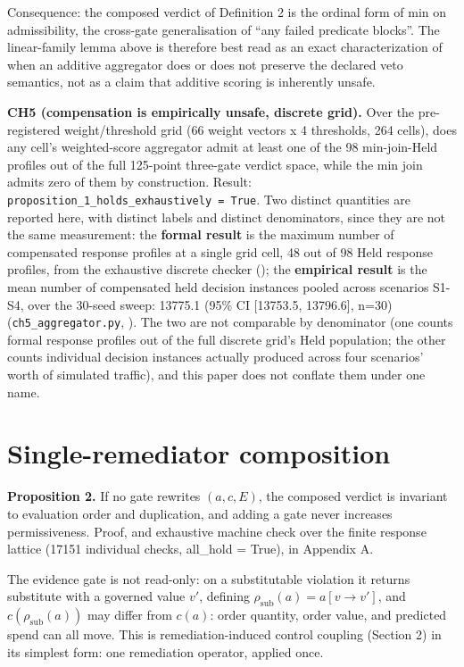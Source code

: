 \documentclass[11pt,a4paper]{article}
\theoremstyle{definition}
\newcommand{\rhosub}{\rho_{\mathrm{sub}}}
\begin{document}
Consequence: the composed verdict of Definition 2 is the ordinal form of min on admissibility, the cross-gate generalisation of ``any failed predicate blocks''. The linear-family lemma above is therefore best read as an exact characterization of when an additive aggregator does or does not preserve the declared veto semantics, not as a claim that additive scoring is inherently unsafe.

\noindent\textbf{CH5 (compensation is empirically unsafe, discrete grid).} Over the pre-registered weight/threshold grid (66 weight vectors x 4 thresholds, 264 cells), does any cell's weighted-score aggregator admit at least one of the 98 min-join-Held profiles out of the full 125-point three-gate verdict space, while the min join admits zero of them by construction. Result: \texttt{proposition\_1\_holds\_exhaustively = True}. Two distinct quantities are reported here, with distinct labels and distinct denominators, since they are not the same measurement: the \textbf{formal result} is the maximum number of compensated response profiles at a single grid cell, 48 out of 98 Held response profiles, from the exhaustive discrete checker (); the \textbf{empirical result} is the mean number of compensated held decision instances pooled across scenarios S1-S4, over the 30-seed sweep: 13775.1 (95\% CI [13753.5, 13796.6], n=30) (\texttt{ch5\_aggregator.py}, ). The two are not comparable by denominator (one counts formal response profiles out of the full discrete grid's Held population; the other counts individual decision instances actually produced across four scenarios' worth of simulated traffic), and this paper does not conflate them under one name.

\section{Single-remediator composition}

\noindent\textbf{Proposition 2.} If no gate rewrites $(a, c, E)$, the composed verdict is invariant to evaluation order and duplication, and adding a gate never increases permissiveness. Proof, and exhaustive machine check over the finite response lattice (17151 individual checks, all\_hold = True), in Appendix A.

The evidence gate is not read-only: on a substitutable violation it returns substitute with a governed value $v'$, defining $\rhosub(a) = a[v \to v']$, and $c(\rhosub(a))$ may differ from $c(a)$: order quantity, order value, and predicted spend can all move. This is remediation-induced control coupling (Section 2) in its simplest form: one remediation operator, applied once.
\end{document}
